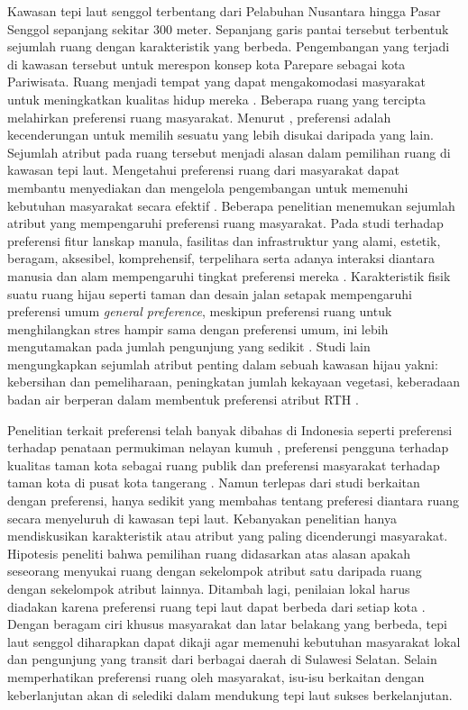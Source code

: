 \documentclass[../projects/thesis.tex]{subfiles}
\begin{document}
Kawasan tepi laut senggol terbentang dari Pelabuhan Nusantara hingga Pasar Senggol sepanjang sekitar 300 meter. Sepanjang garis pantai tersebut terbentuk sejumlah ruang dengan karakteristik yang berbeda. Pengembangan yang terjadi di kawasan tersebut untuk merespon konsep kota Parepare sebagai kota Pariwisata.
Ruang menjadi tempat yang dapat mengakomodasi masyarakat untuk meningkatkan kualitas hidup mereka \citep{kim2012}. Beberapa ruang yang tercipta melahirkan preferensi ruang masyarakat. Menurut \cite{devysandra2012}, preferensi adalah kecenderungan untuk memilih sesuatu yang lebih disukai daripada yang lain. Sejumlah atribut pada ruang tersebut menjadi alasan dalam pemilihan ruang di kawasan tepi laut.
Mengetahui preferensi ruang dari masyarakat dapat membantu menyediakan dan mengelola pengembangan untuk memenuhi kebutuhan masyarakat secara efektif \citep{madureira2018}.
Beberapa penelitian menemukan sejumlah atribut yang mempengaruhi preferensi ruang masyarakat. Pada studi terhadap preferensi fitur lanskap manula, fasilitas dan infrastruktur yang alami, estetik, beragam, aksesibel, komprehensif, terpelihara serta adanya interaksi diantara manusia dan alam mempengaruhi tingkat preferensi mereka \citep{wen2018}. Karakteristik fisik suatu ruang hijau seperti taman dan desain jalan setapak mempengaruhi preferensi umum \textit{general preference}, meskipun preferensi ruang untuk menghilangkan stres hampir sama dengan preferensi umum, ini lebih mengutamakan pada jumlah pengunjung yang sedikit \citep{arnberger2015}. Studi lain mengungkapkan sejumlah atribut penting dalam sebuah kawasan hijau yakni: kebersihan dan pemeliharaan, peningkatan jumlah kekayaan vegetasi, keberadaan badan air berperan dalam membentuk preferensi atribut RTH \citep{madureira2018}.

Penelitian terkait preferensi telah banyak dibahas di Indonesia seperti preferensi terhadap penataan permukiman nelayan kumuh \citep{ramdani2013}, preferensi pengguna terhadap kualitas taman kota sebagai ruang publik \citep{pratomo2017} dan  preferensi masyarakat terhadap taman kota di pusat kota tangerang \citep{imansari2015}.
Namun terlepas dari studi berkaitan dengan preferensi, hanya sedikit yang membahas tentang preferesi diantara ruang secara menyeluruh di kawasan tepi laut.
Kebanyakan penelitian hanya mendiskusikan karakteristik atau atribut yang paling dicenderungi masyarakat. Hipotesis peneliti bahwa pemilihan ruang didasarkan atas alasan apakah seseorang menyukai ruang dengan sekelompok atribut satu daripada ruang dengan sekelompok atribut lainnya.
Ditambah lagi, penilaian lokal harus diadakan karena preferensi ruang tepi laut dapat berbeda dari setiap kota \citep{madureira2018}.
Dengan beragam ciri khusus masyarakat dan latar belakang yang berbeda, tepi laut senggol diharapkan dapat dikaji agar memenuhi kebutuhan masyarakat lokal dan pengunjung yang transit dari berbagai daerah di Sulawesi Selatan.
Selain memperhatikan preferensi ruang oleh masyarakat, isu-isu berkaitan dengan keberlanjutan akan di selediki dalam mendukung tepi laut sukses berkelanjutan.
\end{document}
